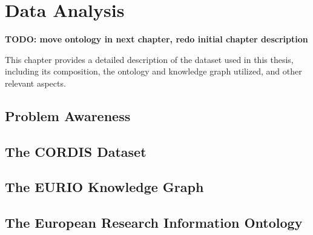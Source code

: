 \chapter{Data Analysis}\label{chap:data-analysis}

\textbf{TODO: move ontology in next chapter, redo initial chapter description}

This chapter provides a detailed description of the dataset used in this thesis, including its composition, the ontology and knowledge graph utilized, and other relevant aspects.

\section{Problem Awareness}\label{sec:problem-awareness}

%
\section{The CORDIS Dataset}\label{sec:cordis-dataset}

%
\section{The EURIO Knowledge Graph}\label{sec:eurio-kg}

%
\section{The European Research Information Ontology}\label{sec:eurio}

